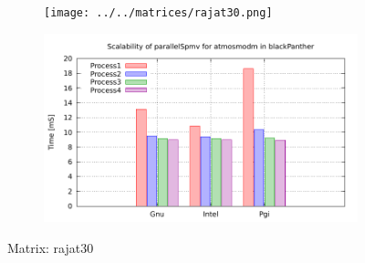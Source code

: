 \begin{figure} [ht!]
    \centering
    \captionsetup{justification=centering, singlelinecheck=false}
    \begin{subfigure}{.65\textwidth}
      \centering
      \hspace*{-3.5cm} 
      \texttt{[image: ../../matrices/rajat30.png]}
      \label{fig:rajat30_matrix}
    \end{subfigure}%
    \begin{subfigure}{.65\textwidth}
      \centering
      \hspace*{-6.0cm} 
      \includegraphics[page=6, width=0.95\linewidth]{../plots/blackPanther.pdf}
      \label{fig:rajat30_performance}
    \end{subfigure}
\caption{Matrix: rajat30}
\label{fig:rajat30}
\end{figure}


